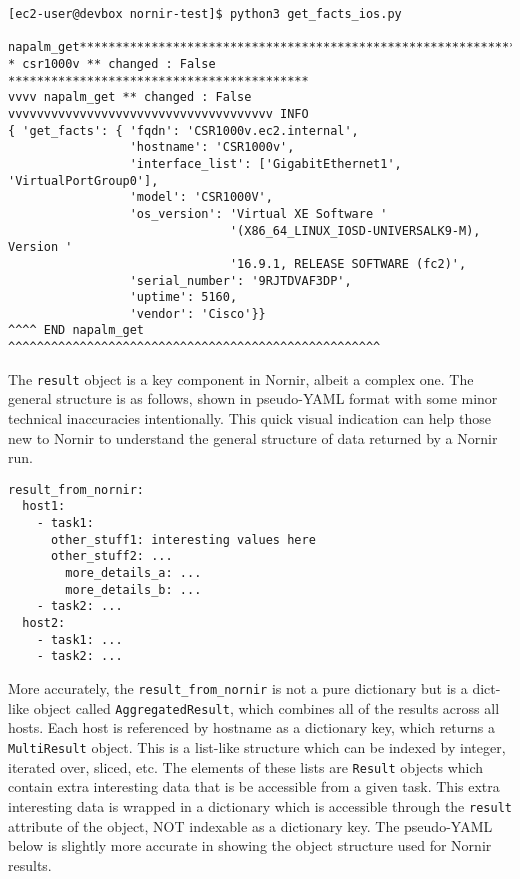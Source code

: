 \begin{verbatim}
[ec2-user@devbox nornir-test]$ python3 get_facts_ios.py 

napalm_get**************************************************************
* csr1000v ** changed : False ******************************************
vvvv napalm_get ** changed : False vvvvvvvvvvvvvvvvvvvvvvvvvvvvvvvvvvvvv INFO
{ 'get_facts': { 'fqdn': 'CSR1000v.ec2.internal',
                 'hostname': 'CSR1000v',
                 'interface_list': ['GigabitEthernet1', 'VirtualPortGroup0'],
                 'model': 'CSR1000V',
                 'os_version': 'Virtual XE Software '
                               '(X86_64_LINUX_IOSD-UNIVERSALK9-M), Version '
                               '16.9.1, RELEASE SOFTWARE (fc2)',
                 'serial_number': '9RJTDVAF3DP',
                 'uptime': 5160,
                 'vendor': 'Cisco'}}
^^^^ END napalm_get ^^^^^^^^^^^^^^^^^^^^^^^^^^^^^^^^^^^^^^^^^^^^^^^^^^^^
\end{verbatim}

The \verb|result| object is a key component in Nornir, albeit a complex one.
The general structure is as follows, shown in pseudo-YAML format with some
minor technical inaccuracies intentionally. This quick visual indication can
help those new to Nornir to understand the general structure of data returned
by a Nornir run.

\begin{verbatim}
result_from_nornir:
  host1:
    - task1:
      other_stuff1: interesting values here
      other_stuff2: ...
        more_details_a: ...
        more_details_b: ...
    - task2: ...
  host2:
    - task1: ...
    - task2: ...
\end{verbatim}

More accurately, the \verb|result_from_nornir| is not a pure dictionary but is
a dict-like object called \verb|AggregatedResult|, which combines all of the
results across all hosts. Each host is referenced by hostname as a dictionary
key, which returns a \verb|MultiResult| object. This is a list-like structure
which can be indexed by integer, iterated over, sliced, etc. The elements of
these lists are \verb|Result| objects which contain extra interesting data
that is be accessible from a given task. This extra interesting data is
wrapped in a dictionary which is accessible through the \verb|result|
attribute of the object, NOT indexable as a dictionary key. The pseudo-YAML
below is slightly more accurate in showing the object structure used for
Nornir results.

